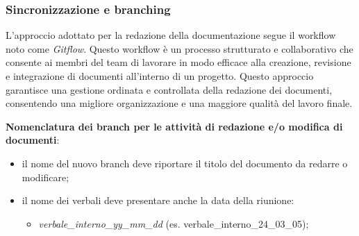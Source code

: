 \subsubsection{Sincronizzazione e branching}

	\label{nomenclatura}
L'approccio adottato per la redazione della documentazione segue il workflow noto come \textit{Gitflow}. Questo workflow è un processo strutturato e collaborativo che consente ai membri del team di lavorare in modo efficace alla creazione, revisione e integrazione di documenti all'interno di un progetto. Questo approccio garantisce una gestione ordinata e controllata della redazione dei documenti, consentendo una migliore organizzazione e una maggiore qualità del lavoro finale.
\begin{flushleft}
	\textbf{Nomenclatura dei branch per le attività di redazione e/o modifica di documenti}: \label{convenzioni_nomenclatura}
\end{flushleft}
\begin{itemize}
	\item il nome del nuovo branch deve riportare il titolo del documento da redarre o modificare;
	\item il nome dei verbali deve presentare anche la data della riunione:
	      \begin{itemize}
		      \item \textit{verbale\_interno\_yy\_mm\_dd} (es. verbale\_interno\_24\_03\_05);
	      \end{itemize}
\end{itemize}

